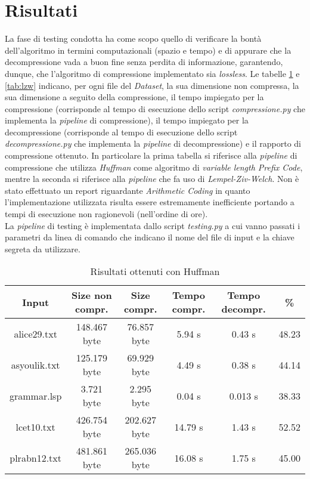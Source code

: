 \section{Risultati}
La fase di testing condotta ha come scopo quello di verificare la bontà dell'algoritmo in termini computazionali (spazio e tempo) e di appurare che la decompressione vada a buon fine senza perdita di informazione, garantendo, dunque, che l'algoritmo di compressione implementato sia \emph{lossless}. Le tabelle \ref{tab:huffman} e \ref{tab:lzw} indicano, per ogni file del \emph{Dataset}, la sua dimensione non compressa, la sua dimensione a seguito della compressione, il tempo impiegato per la compressione (corrisponde al tempo di esecuzione dello script \emph{compressione.py} che implementa la \emph{pipeline} di compressione), il tempo impiegato per la decompressione (corrisponde al tempo di esecuzione dello script \emph{decompressione.py} che implementa la \emph{pipeline} di decompressione) e il rapporto di compressione ottenuto. In particolare la prima tabella si riferisce alla \emph{pipeline} di compressione che utilizza \emph{Huffman} come algoritmo di \emph{variable length Prefix Code}, mentre la seconda si riferisce alla \emph{pipeline} che fa uso di \emph{Lempel-Ziv-Welch}. Non è stato effettuato un report riguardante \emph{Arithmetic Coding} in quanto l'implementazione utilizzata risulta essere estremamente inefficiente portando a tempi di esecuzione non ragionevoli (nell'ordine di ore). \\ La \emph{pipeline} di testing è implementata dallo script \emph{testing.py} a cui vanno passati i parametri da linea di comando che indicano il nome del file di input e la chiave segreta da utilizzare.
    \begin{table}
    \begin{tabular}{||c c c c c c||} 
     \hline
     Input & Size non compr. & Size compr. & Tempo compr. & Tempo decompr. & \% \\ [0.5ex] 
     \hline\hline
     alice29.txt & 148.467 byte & 76.857 byte & 5.94 s & 0.43 s & 48.23\\ 
     \hline
     asyoulik.txt & 125.179 byte & 69.929 byte & 4.49 s & 0.38 s & 44.14\\
     \hline
     grammar.lsp & 3.721 byte & 2.295 byte & 0.04 s & 0.013 s & 38.33\\
     \hline
     lcet10.txt & 426.754 byte & 202.627 byte & 14.79 s & 1.43 s & 52.52\\
     \hline
     plrabn12.txt & 481.861 byte & 265.036 byte & 16.08 s & 1.75 s & 45.00\\ [1ex] 
     \hline
    \end{tabular} 
    \caption{Risultati ottenuti con Huffman\label{tab:huffman}}
    \end{table}
